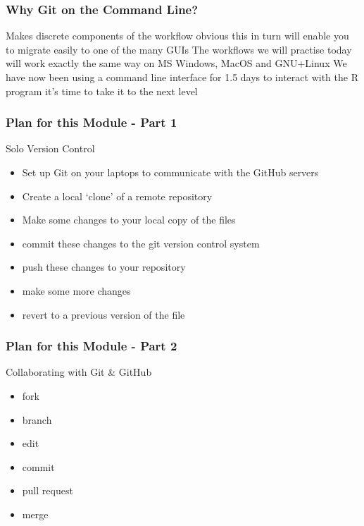 \documentclass[xcolor=dvipsnames]{beamer}
\begin{document}
\begin{frame}
\frametitle{Why Git on the Command Line?}
Makes discrete components of the workflow obvious this in turn will enable you to migrate easily to one of the many GUIs
\newline
\newline
The workflows we will practise today will work exactly the same way on MS Windows, MacOS and GNU+Linux
\newline
\newline
We have now been using a command line interface for 1.5 days to interact with the R program it's time to take it to the next level
\end{frame}

\begin{frame} 
\frametitle{Plan for this Module - Part 1}
\begin{block}{Solo Version Control}
\begin{itemize}
\item Set up Git on your laptops to communicate with the GitHub servers
\item Create a local `clone' of a remote repository
\item Make some changes to your local copy of the files
\item commit these changes to the git version control system
\item push these changes to your repository
\item make some more changes
\item revert to a previous version of the file
\end{itemize}
\end{block}
\end{frame}

\begin{frame} 
\frametitle{Plan for this Module - Part 2}

\begin{block}{Collaborating with Git \& GitHub}
\begin{itemize}
\item fork
\item branch 
\item edit
\item commit
\item pull request
\item merge
\end{itemize}
\end{block}

\end{frame}
\end{document}
